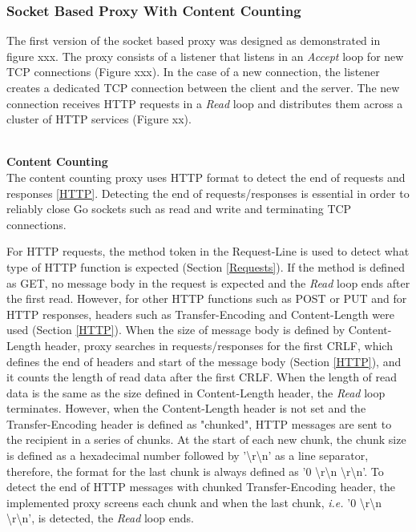 \documentclass[a4paper,11pt,twoside]{article}
\begin{document}
\subsubsection{Socket Based Proxy With Content Counting}\label{Content-Counting}
The first version of the socket based proxy was designed as demonstrated in figure xxx. The proxy consists of a listener that listens in an  \textit{Accept} loop for new TCP connections (Figure xxx). In the case of a new connection, the listener creates a dedicated TCP connection between the client and the server. The new connection receives HTTP requests in a  \textit{Read} loop and distributes them across a cluster of HTTP services (Figure xx).  

\noindent\\
\textbf{Content Counting}\\
The content counting proxy uses HTTP format to detect the end of requests and responses \ref{HTTP}. Detecting the end of requests/responses is essential in order to reliably close Go sockets such as read and write and terminating TCP connections. 

For HTTP requests, the method token in the Request-Line is used to detect what type of HTTP function is expected (Section \ref{Requests}). If the method is defined as GET, no message body in the request is expected and the  \textit{Read} loop ends after the first read. However, for other HTTP functions such as POST or PUT and for HTTP responses, headers such as Transfer-Encoding and Content-Length were used (Section \ref{HTTP}). When the size of message body is defined by Content-Length header, proxy searches  in requests/responses for the first CRLF, which defines the end of headers and start of the message body (Section \ref{HTTP}), and it counts the length of read data after the first CRLF. When the length of read data is the same as the size defined in Content-Length header, the \textit{Read} loop terminates. However, when the Content-Length header is not set and the Transfer-Encoding header is defined as "chunked", HTTP messages are sent to the recipient in a series of chunks. At the start of each new chunk, the chunk size is defined as a hexadecimal number followed by '\textbackslash r\textbackslash n' as a line separator, therefore, the format for the last chunk is always defined as '0 \textbackslash r\textbackslash n \textbackslash r\textbackslash n'. To detect the end of HTTP messages with chunked Transfer-Encoding header, the implemented proxy screens each chunk and when the last chunk, \textit{i.e.} '0 \textbackslash r\textbackslash n \textbackslash r\textbackslash n', is detected, the  \textit{Read} loop ends. 
\end{document}
